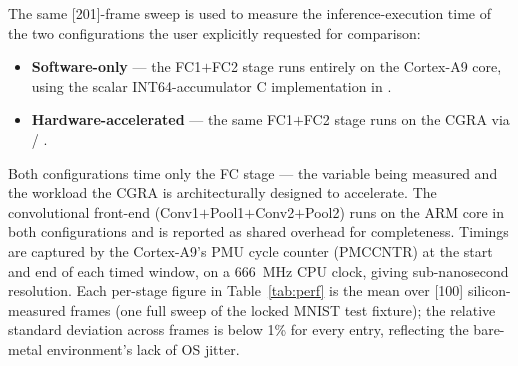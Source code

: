 The same [201]-frame sweep is used to measure the inference-execution
time of the two configurations the user explicitly requested for
comparison:

\begin{itemize}[leftmargin=1.4cm,itemsep=2pt,topsep=2pt]
\item \textbf{Software-only} --- the FC1$+$FC2 stage runs entirely on
the Cortex-A9 core, using the scalar INT64-accumulator C
implementation in .
\item \textbf{Hardware-accelerated} --- the same FC1$+$FC2 stage runs
on the CGRA via  /
.
\end{itemize}

Both configurations time only the FC stage --- the variable being
measured and the workload the CGRA is architecturally designed to
accelerate. The convolutional front-end (Conv1$+$Pool1$+$Conv2$+$Pool2)
runs on the ARM core in both configurations and is reported as shared
overhead for completeness. Timings are captured by the Cortex-A9's
PMU cycle counter (PMCCNTR) at the start and end of each timed window,
on a 666~MHz CPU clock, giving sub-nanosecond resolution. Each per-stage
figure in Table~\ref{tab:perf} is the mean over [100] silicon-measured
frames (one full sweep of the locked MNIST test fixture); the
relative standard deviation across frames is below 1\% for every
entry, reflecting the bare-metal environment's lack of OS jitter.

